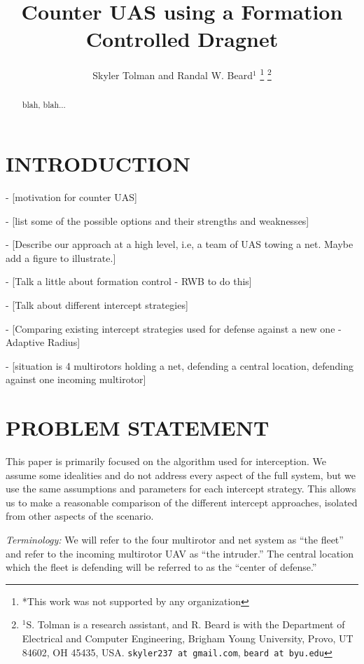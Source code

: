 \documentclass[letterpaper, 10 pt, conference]{ieeeconf}  %
\title{\LARGE \bf
Counter UAS using a Formation Controlled Dragnet
}
\author{Skyler Tolman and Randal W. Beard$^{1}$%
\thanks{*This work was not supported by any organization}%
\thanks{$^{1}$S. Tolman is a research assistant, and R. Beard is with the Department of Electrical and Computer Engineering, Brigham Young University, Provo, UT 84602, OH 45435, USA.  
        {\tt\small skyler237 at gmail.com}, 
        {\tt\small beard at byu.edu}}%
}
\begin{document}
\maketitle
\thispagestyle{empty}
\pagestyle{empty}


\begin{abstract}

blah, blah...

\end{abstract}


\section{INTRODUCTION}

- [motivation for counter UAS]

- [list some of the possible options and their strengths and weaknesses]

- [Describe our approach at a high level, i.e, a team of UAS towing a net.  Maybe add a figure to illustrate.]

- [Talk a little about formation control - RWB to do this]

- [Talk about different intercept strategies]	

- [Comparing existing intercept strategies used for defense against a new one - Adaptive Radius]

- [situation is 4 multirotors holding a net, defending a central location, defending against one incoming multirotor]

\section{PROBLEM STATEMENT}

This paper is primarily focused on the algorithm used for interception. We assume some idealities and do not address every aspect of the full system, but we use the same assumptions and parameters for each intercept strategy. This allows us to make a reasonable comparison of the different intercept approaches, isolated from other aspects of the scenario.

{\em Terminology:} We will refer to the four multirotor and net system as “the fleet” and refer to the incoming multirotor UAV as “the intruder.” The central location which the fleet is defending will be referred to as the “center of defense.”
\end{document}
